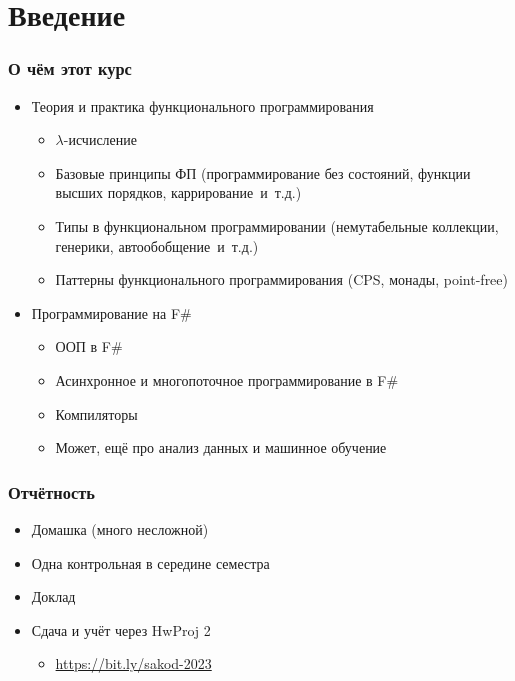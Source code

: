 \documentclass{../../slides-style}
\begin{document}
    
    \begin{frame}[plain]
        \titlepage
    \end{frame}
    
    \section{Введение}
    
    \begin{frame}
        \frametitle{О чём этот курс}
        \begin{itemize}
            \item Теория и практика функционального программирования
            \begin{itemize}
                \item $\lambda$-исчисление
                \item Базовые принципы ФП (программирование без состояний, функции высших порядков, каррирование~и~т.д.)
                \item Типы в функциональном программировании (немутабельные коллекции,
                    генерики, автообобщение~и~т.д.)
                \item Паттерны функционального программирования (CPS, монады, point-free)
            \end{itemize}
            \item Программирование на F\# 
            \begin{itemize}
                \item ООП в F\#
                \item Асинхронное и многопоточное программирование в F\#
                \item Компиляторы
                \item Может, ещё про анализ данных и машинное обучение
            \end{itemize}
        \end{itemize}
    \end{frame}

    \begin{frame}
        \frametitle{Отчётность}
        \begin{itemize}
            \item Домашка (много несложной)
            \item Одна контрольная в середине семестра
            \item Доклад
            \item Сдача и учёт через HwProj 2
            \begin{itemize}
                \item \url{https://bit.ly/sakod-2023}
            \end{itemize}
        \end{itemize}
    \end{frame}
\end{document}
